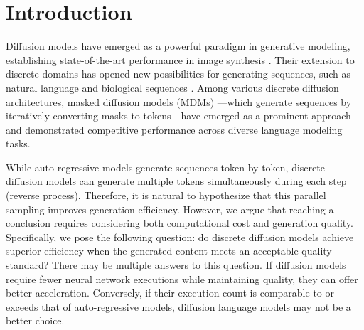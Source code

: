 \section{Introduction}
\label{sec:intro}

Diffusion models \citep{Ho2020Denoising,Song2020ScoreBased} have emerged as a powerful paradigm in generative modeling, establishing state-of-the-art performance in image synthesis \citep{Karras2022Elucidating,song2021denoising}. Their extension to discrete domains has opened new possibilities for generating sequences, such as natural language \citep{Campbell2022ACT,Dieleman2022Continuous,Zheng2023ARD,lou2024discrete,campbell2024generative,lovelace2024diffusion} and biological sequences \citep{rastogi2022semi,vignac2022digress,sun2023difusco,avdeyev2023dirichlet}. Among various discrete diffusion architectures, masked diffusion models (MDMs) \citep{shi2024simplified,sahoo2024simple,ou2024your}—which generate sequences by iteratively converting masks to tokens—have emerged as a prominent approach and demonstrated competitive performance across diverse language modeling tasks.


While auto-regressive models generate sequences token-by-token, discrete diffusion models can generate multiple tokens simultaneously during each step (reverse process). Therefore, it is natural to hypothesize that this parallel sampling improves generation efficiency. However, we argue that reaching a conclusion requires considering both computational cost and generation quality. Specifically, we pose the following question: do discrete diffusion models achieve superior efficiency when the generated content meets an acceptable quality standard? There may be multiple answers to this question. If diffusion models require fewer neural network executions while maintaining quality, they can offer better acceleration. Conversely, if their execution count is comparable to or exceeds that of auto-regressive models, diffusion language models may not be a better choice.

